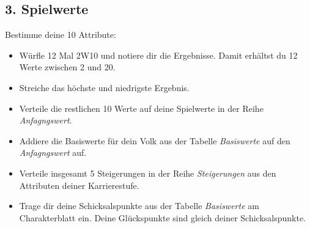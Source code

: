 \documentclass[a4paper,10pt,twoside,twocolumn,openany,bg=none]{dndbook}
\begin{document}

\subsection{3. Spielwerte}
Bestimme deine 10 Attribute:
\begin{itemize}[noitemsep]
  \item Würfle 12 Mal 2W10 und notiere dir die Ergebnisse. Damit erhältst du 12 Werte zwischen 2 und 20.
  \item Streiche das höchste und niedrigste Ergebnis.
  \item Verteile die restlichen 10 Werte auf deine Spielwerte in der Reihe \textit{Anfagngswert}.
  \item Addiere die Basiswerte für dein Volk aus der Tabelle \textit{Basiswerte} auf den \textit{Anfagngswert} auf.
  \item Verteile insgesamt 5 Steigerungen in der Reihe \textit{Steigerungen} aus den Attributen deiner Karrierestufe.
  \item Trage dir deine Schicksalspunkte aus der Tabelle \textit{Basiswerte} am Charakterblatt ein. Deine Glückspunkte sind gleich deiner Schicksalspunkte.
\end{itemize}
\end{document}
